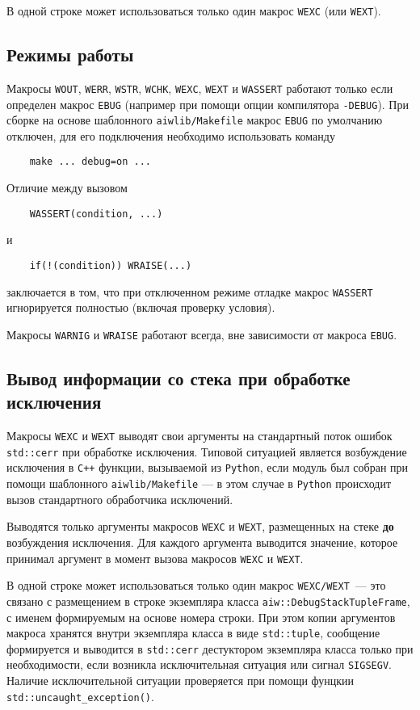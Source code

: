 В одной строке может использоваться только один макрос \verb'WEXC' (или \verb'WEXT').

\subsection{Режимы работы}
Макросы \verb'WOUT', \verb'WERR', \verb'WSTR', \verb'WCHK', \verb'WEXC', \verb'WEXT' и \verb'WASSERT' работают только если определен макрос \verb'EBUG'
(например при помощи опции компилятора \verb'-DEBUG'). При сборке на основе шаблонного \verb'aiwlib/Makefile'
макрос \verb'EBUG' по умолчанию отключен, для его подключения необходимо использовать команду
\begin{verbatim}
    make ... debug=on ...
\end{verbatim}

Отличие между вызовом 
\begin{verbatim}
    WASSERT(condition, ...)
\end{verbatim}
и
\begin{verbatim}
    if(!(condition)) WRAISE(...)
\end{verbatim}
заключается в том, что при отключенном режиме отладке макрос \verb'WASSERT' игнорируется полностью (включая проверку условия).

Макросы \verb'WARNIG' и \verb'WRAISE' работают всегда, вне зависимости от макроса \verb'EBUG'.

\subsection{Вывод информации со стека при обработке исключения}
Макросы \verb'WEXC' и \verb'WEXT' выводят свои аргументы на стандартный поток ошибок \verb'std::cerr' при обработке исключения.
Типовой ситуацией является возбуждение исключения в \verb'C++' функции, вызываемой из \verb'Python', если
модуль был собран при помощи шаблонного \verb'aiwlib/Makefile' --- в этом случае в \verb'Python' происходит
вызов стандартного обработчика исключений.

Выводятся только аргументы макросов \verb'WEXC' и \verb'WEXT', размещенных на стеке {\bf до} возбуждения исключения.
Для каждого аргумента выводится значение, которое принимал аргумент в момент вызова макросов \verb'WEXC' и \verb'WEXT'.

В одной строке может использоваться только один макрос \verb'WEXC/WEXT'~--- это связано с размещением в строке
экземпляра класса \verb'aiw::DebugStackTupleFrame', с именем формируемым на основе номера строки.
При этом копии аргументов макроса хранятся внутри экземпляра класса в виде \verb'std::tuple', сообщение формируется и выводится в \verb'std::cerr'
дестуктором экземпляра класса только при необходимости, если возникла исключительная ситуация или сигнал \verb'SIGSEGV'.
Наличие исключительной ситуации проверяется при помощи фунцкии \verb'std::uncaught_exception()'.

